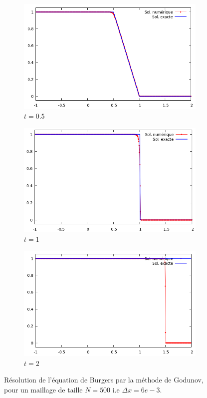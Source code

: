 \documentclass[
	french,
	11pt, %
]{fphw}
\begin{document}
\begin{figure}[H]
	\centering
	\begin{subfigure}{0.32\textwidth}
		\centering
		\includegraphics[width=\textwidth]{Burgers5.png}
		\caption{$t=0.5$}
	\end{subfigure}
	\begin{subfigure}{0.32\textwidth}
		\centering
		\includegraphics[width=\textwidth]{Burgers6.png}
		\caption{$t=1$}
	\end{subfigure}
	\begin{subfigure}{0.32\textwidth}
		\centering
		\includegraphics[width=\textwidth]{Burgers7.png}
		\caption{$t=2$}
		\label{fig:BurgersFaux2}
	\end{subfigure}
	\caption{Résolution de l'équation de Burgers par la méthode de Godunov, pour un maillage de taille $N=500$ i.e $\Delta x = 6e-3$.}
	\label{fig:Burgers2}
\end{figure}
\end{document}
